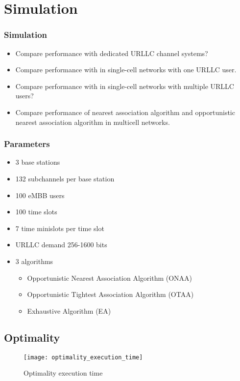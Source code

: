 \section{Simulation}
\begin{frame}
  \frametitle{Simulation}
  \begin{itemize}
    \item Compare performance with dedicated URLLC channel systems?
    \item Compare performance with \cite{AVS20} in single-cell networks with one URLLC user.
    \item Compare performance with \cite{YZR21} in single-cell networks with multiple URLLC users?
    \item Compare performance of nearest association algorithm and opportunistic nearest association algorithm in multicell networks.
  \end{itemize}
\end{frame}

\begin{frame}
  \frametitle{Parameters}
  \begin{itemize}
    \item 3 base stations
    \item 132 subchannels per base station \cite{3GPP22}
    \item 100 eMBB users
    \item 100 time slots
    \item 7 time minislots per time slot
    \item URLLC demand 256-1600 bits \cite{3GPP17}
    \item 3 algorithms
      \begin{itemize}
        \item Opportunistic Nearest Association Algorithm (ONAA)
        \item Opportunistic Tightest Association Algorithm (OTAA)
        \item Exhaustive Algorithm (EA)
      \end{itemize}
  \end{itemize}
\end{frame}

\subsection{Optimality}
\begin{frame}
  \begin{figure}
    \texttt{[image: optimality\_execution\_time]}
    \caption{Optimality execution time}
  \end{figure}
\end{frame}

